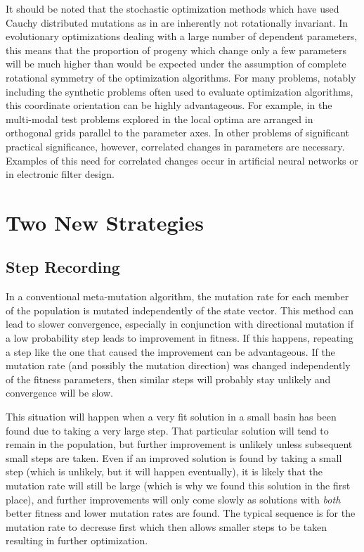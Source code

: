 \documentclass[12pt, titlepage]{article}
\begin{document}
It should be noted that the stochastic optimization methods which have
used Cauchy distributed mutations as in
\cite{fishman,szu,yao91,yao95,yao97} are inherently not rotationally
invariant.  In evolutionary optimizations dealing with a large number
of dependent parameters, this means that the proportion of progeny
which change only a few parameters will be much higher than would be
expected under the assumption of complete rotational symmetry of the
optimization algorithms.  For many problems, notably including the
synthetic problems often used to evaluate optimization algorithms,
this coordinate orientation can be highly advantageous.  For example,
in the multi-modal test problems explored in \cite{yao97} the local
optima are arranged in orthogonal grids parallel to the parameter
axes.  In other problems of significant practical significance,
however, correlated changes in parameters are necessary.  Examples of
this need for correlated changes occur in artificial neural networks
or in electronic filter design.

\section{Two New Strategies}

\subsection{Step Recording}

In a conventional meta-mutation algorithm, the mutation rate for each
member of the population is mutated independently of the state vector.
This method can lead to slower convergence, especially in conjunction
with directional mutation if a low probability step leads to
improvement in fitness.  If this happens, repeating a step like the
one that caused the improvement can be advantageous.  If the mutation
rate (and possibly the mutation direction) was changed independently
of the fitness parameters, then similar steps will probably stay
unlikely and convergence will be slow.

This situation will happen when a very fit solution in a small basin
has been found due to taking a very large step.  That particular
solution will tend to remain in the population, but further
improvement is unlikely unless subsequent small steps are taken.  Even
if an improved solution is found by taking a small step (which is
unlikely, but it will happen eventually), it is likely that the
mutation rate will still be large (which is why we found this solution
in the first place), and further improvements will only come slowly as
solutions with {\em both} better fitness and lower mutation rates are
found.  The typical sequence is for the mutation rate to decrease
first which then allows smaller steps to be taken resulting in further
optimization.
\end{document}
